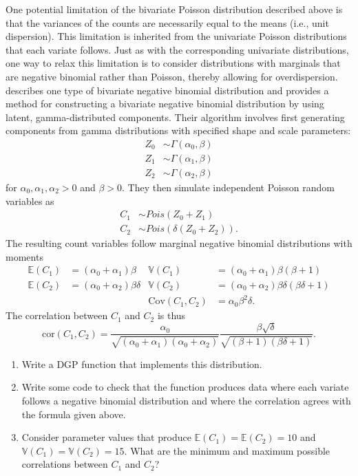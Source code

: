 \documentclass[
]{book}
\begin{document}
One potential limitation of the bivariate Poisson distribution described above is that the variances of the counts are necessarily equal to the means (i.e., unit dispersion).
This limitation is inherited from the univariate Poisson distributions that each variate follows.
Just as with the corresponding univariate distributions, one way to relax this limitation is to consider distributions with marginals that are negative binomial rather than Poisson, thereby allowing for overdispersion.
\citet{Cho2023bivariate} describes one type of bivariate negative binomial distribution and provides a method for constructing a bivariate negative binomial distribution by using latent, gamma-distributed components.
Their algorithm involves first generating components from gamma distributions with specified shape and scale parameters:
\[
\begin{aligned}
Z_0 &\sim \Gamma\left( \alpha_0, \beta\right) \\
Z_1 &\sim \Gamma\left( \alpha_1, \beta\right) \\
Z_2 &\sim \Gamma\left( \alpha_2, \beta\right)
\end{aligned}
\]
for \(\alpha_0,\alpha_1,\alpha_2 > 0\) and \(\beta > 0\).
They then simulate independent Poisson random variables as
\[
\begin{aligned}
C_1 &\sim Pois\left( Z_0 + Z_1 \right) \\
C_2 &\sim Pois\left( \delta(Z_0 + Z_2) \right).
\end{aligned}
\]
The resulting count variables follow marginal negative binomial distributions with moments
\[
\begin{aligned}
\mathbb{E}(C_1) &= (\alpha_0 + \alpha_1) \beta & \mathbb{V}(C_1) &= (\alpha_0 + \alpha_1) \beta (\beta + 1) \\
\mathbb{E}(C_2) &= (\alpha_0 + \alpha_2) \beta \delta & \mathbb{V}(C_2) &= (\alpha_0 + \alpha_2) \beta \delta (\beta \delta + 1) \\
& & \text{Cov}(C_1, C_2) &= \alpha_0 \beta^2 \delta.
\end{aligned}
\]
The correlation between \(C_1\) and \(C_2\) is thus
\[
\text{cor}(C_1, C_2) = \frac{\alpha_0}{\sqrt{(\alpha_0 + \alpha_1)(\alpha_0 + \alpha_2)}} \frac{\beta \sqrt{\delta}}{\sqrt{(\beta + 1)(\beta \delta + 1)}}.
\]

\begin{enumerate}
\def\labelenumi{\arabic{enumi}.}
\item
  Write a DGP function that implements this distribution.
\item
  Write some code to check that the function produces data where each variate follows a negative binomial distribution and where the correlation agrees with the formula given above.
\item
  Consider parameter values that produce \(\mathbb{E}(C_1) = \mathbb{E}(C_2) = 10\) and \(\mathbb{V}(C_1) = \mathbb{V}(C_2) = 15\). What are the minimum and maximum possible correlations between \(C_1\) and \(C_2\)?
\end{enumerate}
\end{document}
